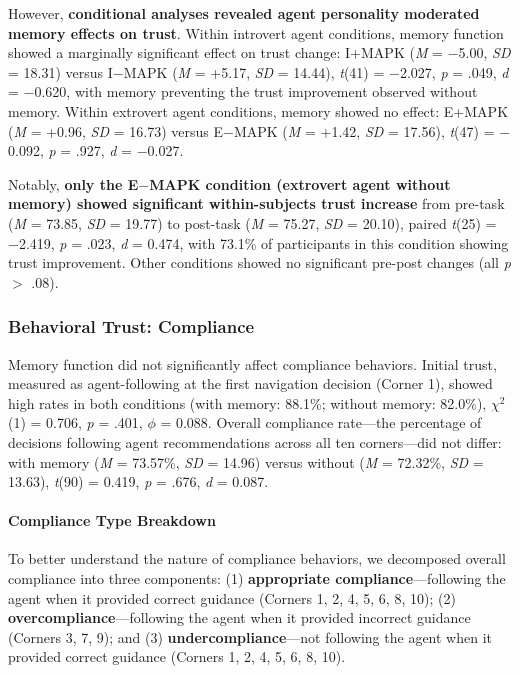 \documentclass[12pt]{article}
\begin{document}
However, \textbf{conditional analyses revealed agent personality moderated memory effects on trust}. Within introvert agent conditions, memory function showed a marginally significant effect on trust change: I+MAPK (\textit{M} = $-$5.00, \textit{SD} = 18.31) versus I$-$MAPK (\textit{M} = +5.17, \textit{SD} = 14.44), \textit{t}(41) = $-$2.027, \textit{p} = .049, \textit{d} = $-$0.620, with memory preventing the trust improvement observed without memory. Within extrovert agent conditions, memory showed no effect: E+MAPK (\textit{M} = +0.96, \textit{SD} = 16.73) versus E$-$MAPK (\textit{M} = +1.42, \textit{SD} = 17.56), \textit{t}(47) = $-$0.092, \textit{p} = .927, \textit{d} = $-$0.027.

Notably, \textbf{only the E$-$MAPK condition (extrovert agent without memory) showed significant within-subjects trust increase} from pre-task (\textit{M} = 73.85, \textit{SD} = 19.77) to post-task (\textit{M} = 75.27, \textit{SD} = 20.10), paired \textit{t}(25) = $-$2.419, \textit{p} = .023, \textit{d} = 0.474, with 73.1\% of participants in this condition showing trust improvement. Other conditions showed no significant pre-post changes (all \textit{p} $>$ .08).

\subsubsection{Behavioral Trust: Compliance}

Memory function did not significantly affect compliance behaviors. Initial trust, measured as agent-following at the first navigation decision (Corner 1), showed high rates in both conditions (with memory: 88.1\%; without memory: 82.0\%), $\chi^2$(1) = 0.706, \textit{p} = .401, $\phi$ = 0.088. Overall compliance rate---the percentage of decisions following agent recommendations across all ten corners---did not differ: with memory (\textit{M} = 73.57\%, \textit{SD} = 14.96) versus without (\textit{M} = 72.32\%, \textit{SD} = 13.63), \textit{t}(90) = 0.419, \textit{p} = .676, \textit{d} = 0.087.

\paragraph{Compliance Type Breakdown}

To better understand the nature of compliance behaviors, we decomposed overall compliance into three components: (1) \textbf{appropriate compliance}---following the agent when it provided correct guidance (Corners 1, 2, 4, 5, 6, 8, 10); (2) \textbf{overcompliance}---following the agent when it provided incorrect guidance (Corners 3, 7, 9); and (3) \textbf{undercompliance}---not following the agent when it provided correct guidance (Corners 1, 2, 4, 5, 6, 8, 10).
\end{document}
